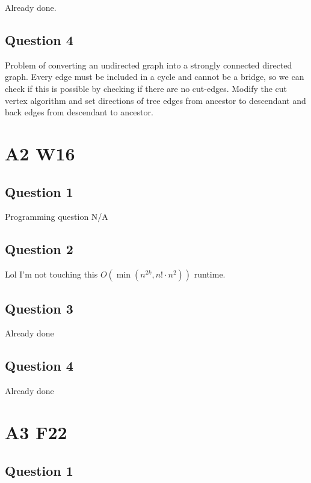 \documentclass[11pt]{article}
\begin{document}
Already done.

\subsection{Question 4}

Problem of converting an undirected graph into a strongly connected directed graph. Every edge must be included in a cycle and cannot be a bridge, so we can check if this is possible by checking if there are no cut-edges. Modify the cut vertex algorithm and set directions of tree edges from ancestor to descendant and back edges from descendant to ancestor.

\section{A2 W16}

\subsection{Question 1}

Programming question N/A

\subsection{Question 2}

Lol I'm not touching this $O(\min(n^{2k}, n! \cdot n^2))$ runtime.

\subsection{Question 3}

Already done

\subsection{Question 4}

Already done

\section{A3 F22}

\subsection{Question 1}
\end{document}
